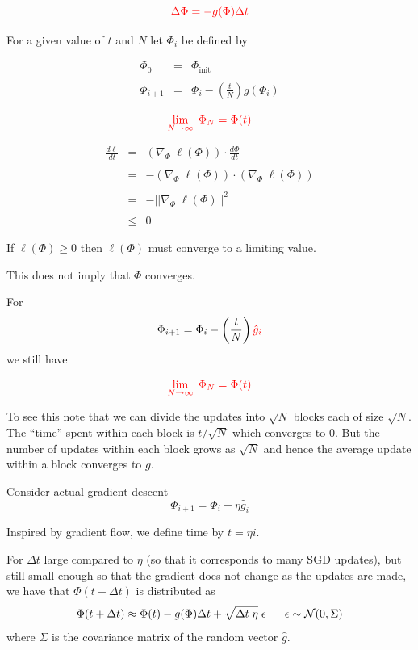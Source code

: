 {

$${\color{red} \Delta \Phi = - g(\Phi)\Delta t}$$

\vfill
For a given value of $t$ and $N$ let $\Phi_i$ be defined by

\vfill
\begin{eqnarray*}
\Phi_0 & = & \Phi_{\mathrm{init}} \\
\\
\Phi_{i+1} & = & \Phi_i - \left(\frac{t}{N}\right) g(\Phi_i)
\end{eqnarray*}

\vfill
$${\color{red} \lim_{N\rightarrow \infty} \;\Phi_N = \Phi(t)}$$



\begin{eqnarray*}
  \frac{d \ell}{d t} & = & (\nabla_\Phi \;\ell(\Phi)) \cdot \frac{d \Phi}{dt} \\
  \\
  & = & - (\nabla_\Phi \;\ell(\Phi)) \cdot (\nabla_\Phi \;\ell(\Phi)) \\
  \\
  & = & - ||\nabla_\Phi \;\ell(\Phi)||^2 \\
  \\
  & \leq & 0
\end{eqnarray*}

\vfill
If $\ell(\Phi) \geq 0$ then $\ell(\Phi)$ must converge to a limiting value.

\vfill
This does not imply that $\Phi$ converges.

For
$$\Phi_{i+1} = \Phi_i - \left(\frac{t}{N}\right) {\color{red} \hat{g}_i}$$
we still have

\vfill
$${\color{red} \lim_{N\rightarrow \infty} \;\Phi_N = \Phi(t)}$$

\vfill
To see this note that we can divide the updates into $\sqrt{N}$ blocks each of size $\sqrt{N}$.  The ``time'' spent within each block is $t/\sqrt{N}$ which converges to 0.
But the number of updates within each block grows as $\sqrt{N}$ and hence the average update within a block converges to $g$.



Consider actual gradient descent
$$\Phi_{i+1} = \Phi_i - \eta\hat{g}_i$$

\vfill
Inspired by gradient flow, we define time by $t = \eta i$.

\vfill
For $\Delta t$ large compared to $\eta$ (so that it corresponds to many SGD updates), but still small enough
so that the gradient does not change as the updates are made, we have that $\Phi(t + \Delta t)$ is distributed as
$$\Phi(t + \Delta t) \approx \Phi(t) -g(\Phi)\Delta t + \sqrt{\Delta t\; \eta}\;\epsilon\;\;\;\;\;\; \epsilon \sim {\cal N}(0,\Sigma)$$
where $\Sigma$ is the covariance matrix of the random vector $\hat{g}$.

}
